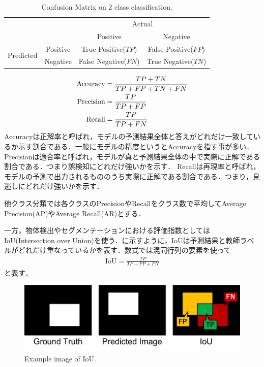 \begin{table}
    \centering
    \caption{Confusion Matrix on 2 class classification.}
    \begin{tabular}{|c|c|c|c|}\hline
        \multicolumn{2}{|c|}{} & \multicolumn{2}{c|}{Actual} \\ \cline{3-4}        \multicolumn{2}{|c|}{} & Positive & Negative \\ \hline
        \multirow{2}{*}{Predicted} & Positive & True Positive($TP$) & False Positive($FP$) \\ \cline{2-4}
        & Negative & False Negative($FN$) & True Negative($TN$) \\ \hline
    \end{tabular} 
    \label{tab:混同行列}
\end{table}

\begin{align}\label{eq:精度}
    \mathrm{Accuracy} & = \frac{TP+TN}{TP+FP+TN+FN} \notag \\ 
    \mathrm{Precision} & = \frac{TP}{TP+FP} \\
    \mathrm{Recall} & = \frac{TP}{TP+FN} \notag
\end{align}
Accuracyは正解率と呼ばれ，モデルの予測結果全体と答えがどれだけ一致しているか示す割合である．一般にモデルの精度というとAccuracyを指す事が多い．
Precisionは適合率と呼ばれ，モデルが真と予測結果全体の中で実際に正解である割合である．つまり誤検知にどれだけ強いかを示す．
Recallは再現率と呼ばれ，モデルの予測で出力されるもののうち実際に正解である割合である．つまり，見逃しにどれだけ強いかを示す．

他クラス分類では各クラスのPrecisionやRecallをクラス数で平均してAverage Precision(AP)やAverage Recall(AR)とする．

一方，物体検出やセグメンテーションにおける評価指数としてはIoU(Intersection over Union)を使う．に示すように，IoUは予測結果と教師ラベルがどれだけ重なっているかを表す．数式では混同行列の要素を使って
\begin{align}\label{eq:IoU}
    \mathrm{IoU} = \frac{TP}{TP+FP+FN}
\end{align}
と表す．
\begin{figure}[H]
    \centering
    \includegraphics[width=\linewidth]{figure/chapter2/IoU}
    \caption{Example image of IoU.}
    \label{fig:IoU}
\end{figure}

